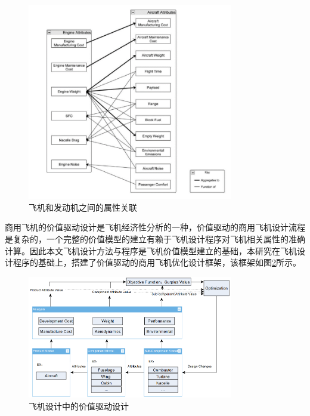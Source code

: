 \documentclass[12pt,a4paper]{report}
\begin{document}
\begin{figure}[ht!]
	\centering
		\includegraphics[width=0.8\textwidth]{./eps/aircraft-engine-integration.png}
		\caption{飞机和发动机之间的属性关联}
		\label{fig:aircraftengines}
\end{figure}

商用飞机的价值驱动设计是飞机经济性分析的一种，价值驱动的商用飞机设计流程是复杂的，一个完整的价值模型的建立有赖于飞机设计程序对飞机相关属性的准确计算。因此本文飞机设计方法与程序是飞机价值模型建立的基础，本研究在飞机设计程序的基础上，搭建了价值驱动的商用飞机优化设计框架，该框架如图\ref{fig:g36vdd}所示。

\begin{figure}[ht!]
	\centering
		\includegraphics[width=0.8\textwidth]{./media3/image33.png}
		\caption{飞机设计中的价值驱动设计}
		\label{fig:g36vdd}
\end{figure}
\end{document}
